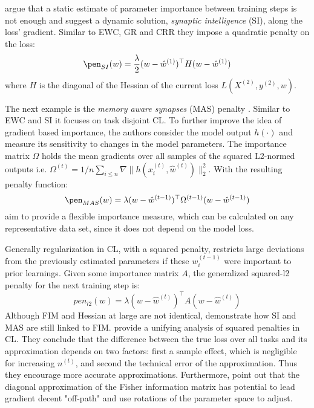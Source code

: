 \citeauthor{zenke2017continuallearningsynapticintelligence} \cite{zenke2017continuallearningsynapticintelligence} argue that a static estimate of parameter importance between training steps is not enough and suggest a dynamic solution, \textit{synaptic intelligence} (SI), along the loss' gradient. Similar to EWC, GR and CRR they impose a quadratic penalty on the loss:
\begin{equation}\label{SI}
	\pen_{SI}(w) = \frac{\lambda}{2} (w - \hat{w}^{(1)})^\top H (w - \hat{w}^{(1)})
\end{equation}
where $H$ is the diagonal of the Hessian of the current loss $L(X^{(2)}, y^{(2)}, w)$.

The next example is the \textit{memory aware synapses} (MAS) penalty \cite{aljundi2018memoryawaresynapseslearning}. Similar to EWC and SI it focuses on task disjoint CL. To further improve the idea of gradient based importance, the authors consider the model output $h(\cdot)$ and measure its sensitivity to changes in the model parameters. The importance matrix $\Omega$ holds the mean gradients over all samples of the squared L2-normed outputs i.e. $\Omega^{(t)} = 1/n \sum_{i \leq n} \nabla \lVert h(x^{(t)}_i, \hat{w}^{(t)}) \rVert_2^2$. With the resulting penalty function:
\begin{equation}\label{MAS}
	\pen_{MAS}(w)=\lambda (w - \hat{w}^{(t-1)})^\top \Omega^{(t-1)} (w - \hat{w}^{(t-1)})
\end{equation}
\citeauthor{aljundi2018memoryawaresynapseslearning} \cite{aljundi2018memoryawaresynapseslearning} aim to provide a flexible importance measure, which can be calculated on any representative data set, since it does not depend on the model loss.

Generally regularization in CL, with a squared penalty, restricts large deviations from the previously estimated parameters if these $w_i^{(t-1)}$ were important to prior learnings. Given some importance matrix $A$, the generalized squared-l2 penalty for the next training step is:
\begin{equation}\label{l2pen}
	pen_{l2}(w) = \lambda (w - \hat{w}^{(t)})^\top A (w - \hat{w}^{(t)})
\end{equation}
Although FIM and Hessian at large are not identical, \citeauthor{benzing2021unifyingregularisationmethodscontinual} \cite{benzing2021unifyingregularisationmethodscontinual} demonstrate how SI and MAS are still linked to FIM. \citeauthor{yin2021optimizationgeneralizationregularizationbasedcontinual} \cite{yin2021optimizationgeneralizationregularizationbasedcontinual} provide a unifying analysis of squared penalties in CL. They conclude that the difference between the true loss over all tasks and its approximation depends on two factors: first a sample effect, which is negligible for increasing $n^{(t)}$, and second the technical error of the approximation. Thus they encourage more accurate approximations. Furthermore, \citeauthor{liu2018rotatenetworksbetterweight} \cite{liu2018rotatenetworksbetterweight} point out that the diagonal approximation of the Fisher information matrix has potential to lead gradient decent "off-path" and use rotations of the parameter space to adjust.

